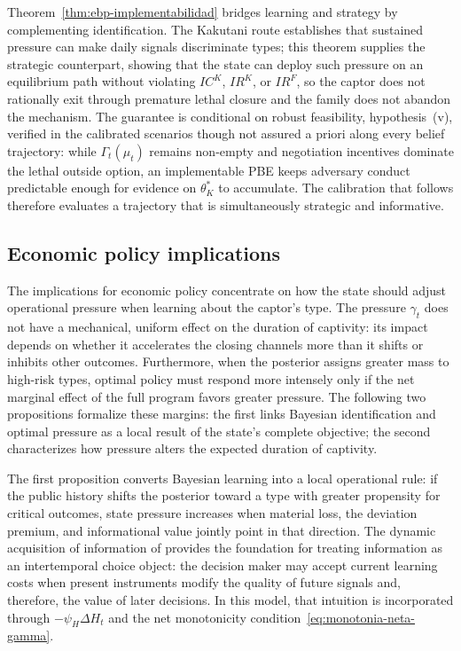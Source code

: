 \documentclass[review,authoryear,12pt]{elsarticle}
\theoremstyle{plain}
\theoremstyle{definition}
\newcommand{\1}{\mathbf{1}}
\begin{document}
\noindent Theorem~\ref{thm:ebp-implementabilidad} bridges learning and strategy by complementing identification. The Kakutani route establishes that sustained pressure can make daily signals discriminate types; this theorem supplies the strategic counterpart, showing that the state can deploy such pressure on an equilibrium path without violating $IC^K$, $IR^K$, or $IR^F$, so the captor does not rationally exit through premature lethal closure and the family does not abandon the mechanism. The guarantee is conditional on robust feasibility, hypothesis~(v), verified in the calibrated scenarios though not assured a priori along every belief trajectory: while $\Gamma_t(\mu_t)$ remains non-empty and negotiation incentives dominate the lethal outside option, an implementable PBE keeps adversary conduct predictable enough for evidence on $\theta_K^\ast$ to accumulate. The calibration that follows therefore evaluates a trajectory that is simultaneously strategic and informative.

\subsection{Economic policy implications}\label{subsec:implicaciones-politica}

\noindent The implications for economic policy concentrate on how the state should adjust operational pressure when learning about the captor's type. The pressure $\gamma_t$ does not have a mechanical, uniform effect on the duration of captivity: its impact depends on whether it accelerates the closing channels more than it shifts or inhibits other outcomes. Furthermore, when the posterior assigns greater mass to high-risk types, optimal policy must respond more intensely only if the net marginal effect of the full program favors greater pressure. The following two propositions formalize these margins: the first links Bayesian identification and optimal pressure as a local result of the state's complete objective; the second characterizes how pressure alters the expected duration of captivity.

\noindent The first proposition converts Bayesian learning into a local operational rule: if the public history shifts the posterior toward a type with greater propensity for critical outcomes, state pressure increases when material loss, the deviation premium, and informational value jointly point in that direction. The dynamic acquisition of information of \citet{Zhong2022} provides the foundation for treating information as an intertemporal choice object: the decision maker may accept current learning costs when present instruments modify the quality of future signals and, therefore, the value of later decisions. In this model, that intuition is incorporated through $-\psi_H\Delta H_t$ and the net monotonicity condition~\eqref{eq:monotonia-neta-gamma}.
\end{document}
